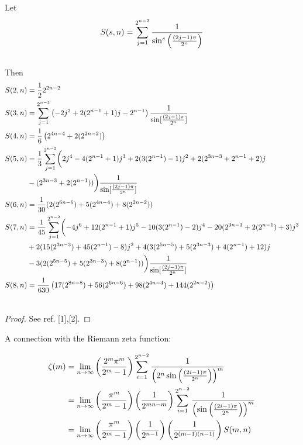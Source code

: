 \documentclass[fleqn,a4paper,9pt]{article}
\begin{document}
\begin{flushleft}
\begin{proposition}
Let
\begin{align}\notag
S(s,n)&=\sum_{j=1}^{2^{n-2}}\frac{1}{\sin^s\left(\frac{(2j-1)\pi}{2^n}\right)}\\\notag
\end{align}
Then
\begin{align}\notag
S(2,n)&=\frac{1}{2}2^{2n-2}\\\notag
S(3,n)&=\sum_{j=1}^{2^{n-2}}\left(-2j^2+2(2^{n-1}+1)j-2^{n-1}\right)\frac{1}{\sin[\frac{(2j-1)\pi}{2^n}]}\\\notag
S(4,n)&=\frac{1}{6}\left(2^{4n-4}+2(2^{2n-2})\right)\\\notag
S(5,n)&=\frac{1}{3}\sum_{j=1}^{2^{n-2}}\biggl(2 j^4-4(2^{n-1}+1)j^3+2(3( 2^{n-1})-1)j^2+2(2^{3n-3}+2^{n-1}+2)j\\\notag
&-(2^{3n-3}+2(2^{n-1}))\biggr)\frac{1}{\sin[\frac{(2j-1)\pi}{2^n}]}\\\notag
S(6,n)&=\frac{1}{30}(2(2^{6n-6})+5(2^{4n-4})+8(2^{2n-2}))\\\notag
S(7,n)&=\frac{1}{45}\sum_{j=1}^{2^{n-2}}\biggl(  -4 j^6+12(2^{n-1}+1)j^5-10(3(2^{n-1})-2)j^4-20(2^{3n-3}+2(2^{n-1})+3)j^3 \\\notag
&+2(15(2^{3n-3})+45(2^{n-1})-8)j^2 +4( 3(2^{5n-5})+5(2^{3n-3})+4(2^{n-1})+12 )j\\\notag
&-3( 2(2^{5n-5})+5(2^{3n-3})+8(2^{n-1}) )\biggr)\frac{1}{\sin[\frac{(2j-1)\pi}{2^n}]}\\\notag
S(8,n)&=\frac{1}{630}\left(17(2^{8n-8})+56(2^{6n-6})+98(2^{4n-4})+144(2^{2n-2})\right)\\\notag
\end{align}
\end{proposition}
\begin{proof}
See ref. [1],[2].
\end{proof}
A connection with the Riemann zeta function:



\begin{align}
\zeta(m)&=\lim_{n\to\infty}\left(\frac{2^m\pi^m}{2^{m}-1}\right) \sum _{i=1}^{2^{n-2}}\frac{1}{ \left(2^n\sin\left(\frac{\left(2 i-1\right)\pi}{2^n}\right)\right)^m} \\\notag
&=\lim_{n\to\infty}\left(\frac{\pi^m}{2^{m}-1}\right) \left(\frac{1}{2^{mn-m}}\right)\sum _{i=1}^{2^{n-2}}\frac{1}{ \left(\sin\left(\frac{\left(2 i-1\right)\pi}{2^n}\right)\right)^m} \\\notag
&=\lim_{n\to\infty}\left(\frac{\pi^m}{2^{m}-1}\right)\left(\frac{1}{2^{n-1}}\right) \left(\frac{1}{2^{(m-1)(n-1)}}\right)S(m,n) \\\notag
\end{align}



\end{flushleft}
\end{document}
